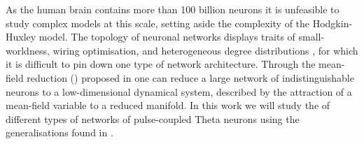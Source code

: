 As the human brain contains more than 100 billion neurons \cite{Herculano2009} it is unfeasible to study complex models at this scale, setting aside the complexity of the Hodgkin-Huxley model. The topology of neuronal networks displays traits of small-worldness, wiring optimisation, and heterogeneous degree distributions \cite{Bullmore2010}, for which it is difficult to pin down one type of network architecture. Through the mean-field reduction (\MFR) proposed in \cite{OttAntonsen2008} one can reduce a large network of indistinguishable neurons to a low-dimensional dynamical system, described by the attraction of a mean-field variable to a reduced manifold.
In this work we will study the \MFR of different types of networks of pulse-coupled Theta neurons using the generalisations found in \cite{OttAntonsen2017}. \\





